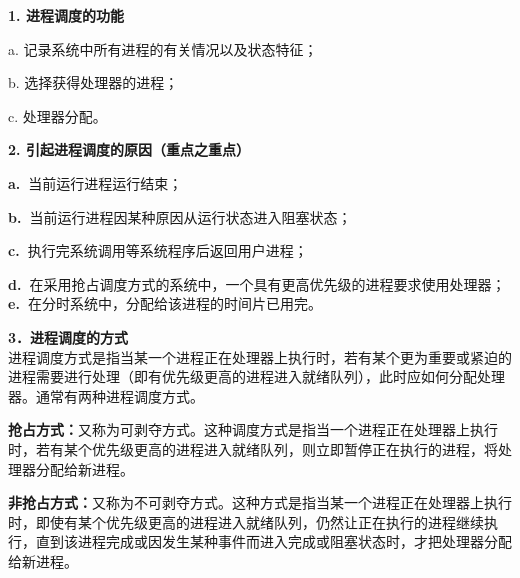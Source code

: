 \textbf{{1. 进程调度的功能}}

{a. 记录系统中所有进程的有关情况以及状态特征；}

{b. 选择获得处理器的进程；}

{c. 处理器分配。}

\textbf{{2. 引起进程调度的原因（{重点之重点}）}}

\textbf{a.~}当前运行进程运行结束；

\textbf{b.~}当前运行进程因某种原因从运行状态进入阻塞状态；

\textbf{c.~}执行完系统调用等系统程序后返回用户进程；

\textbf{d.~}在采用抢占调度方式的系统中，一个具有更高优先级的进程要求使用处理器；\\

\textbf{e.~}在分时系统中，分配给该进程的时间片已用完。

\textbf{{3．进程调度的方式}}\\

进程调度方式是指当某一个进程正在处理器上执行时，若有某个更为重要或紧迫的进程需要进行处理（即有优先级更高的进程进入就绪队列），此时应如何分配处理器。通常有两种进程调度方式。

\textbf{抢占方式：}又称为可剥夺方式。这种调度方式是指{当一个进程正在处理器上执行时，若有某个优先级更高的进程进入就绪队列，则立即暂停正在执行的进程}，将处理器分配给新进程。

\textbf{非抢占方式：}又称为不可剥夺方式。这种方式是指{当某一个进程正在处理器上执行时，即使有某个优先级更高的进程进入就绪队列，仍然让正在执行的进程继续执行，直到该进程完成或因发生某种事件而进入完成或阻塞状态时}，才把处理器分配给新进程。
